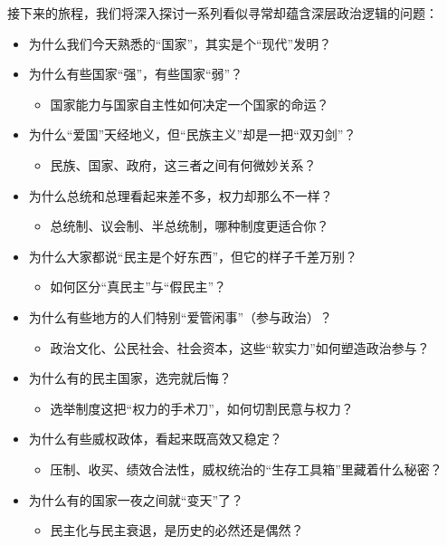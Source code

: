 接下来的旅程，我们将深入探讨一系列看似寻常却蕴含深层政治逻辑的问题：
\begin{itemize}
    \item 为什么我们今天熟悉的“国家”，其实是个“现代”发明？
    \item 为什么有些国家“强”，有些国家“弱”？
    \begin{itemize}
        \item 国家能力与国家自主性如何决定一个国家的命运？
    \end{itemize}
    \item 为什么“爱国”天经地义，但“民族主义”却是一把“双刃剑”？
    \begin{itemize}
        \item 民族、国家、政府，这三者之间有何微妙关系？
    \end{itemize}
    \item 为什么总统和总理看起来差不多，权力却那么不一样？
    \begin{itemize}
        \item 总统制、议会制、半总统制，哪种制度更适合你？
    \end{itemize}
    \item 为什么大家都说“民主是个好东西”，但它的样子千差万别？
    \begin{itemize}
        \item 如何区分“真民主”与“假民主”？
    \end{itemize}
    \item 为什么有些地方的人们特别“爱管闲事”（参与政治）？
    \begin{itemize}
        \item 政治文化、公民社会、社会资本，这些“软实力”如何塑造政治参与？
    \end{itemize}
    \item 为什么有的民主国家，选完就后悔？
    \begin{itemize}
        \item 选举制度这把“权力的手术刀”，如何切割民意与权力？
    \end{itemize}
    \item 为什么有些威权政体，看起来既高效又稳定？
    \begin{itemize}
        \item 压制、收买、绩效合法性，威权统治的“生存工具箱”里藏着什么秘密？
    \end{itemize}
    \item 为什么有的国家一夜之间就“变天”了？
    \begin{itemize}
        \item 民主化与民主衰退，是历史的必然还是偶然？

\end{itemize}
\end{itemize}
